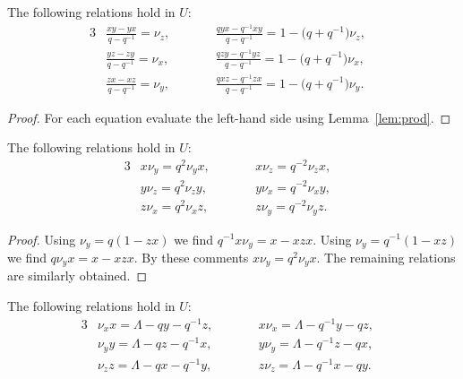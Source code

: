\begin{Lemma}
The following relations hold in
$U$:
\begin{alignat}{3}
& \frac{xy-yx}{q-q^{-1}}=
\nu_z, \qquad &&
\frac{qyx-q^{-1}xy}{q-q^{-1}}= 1-\big(q+q^{-1}\big)\nu_z,&
\label{eq:double1}
\\
& \frac{yz-zy}{q-q^{-1}}=
\nu_x,\qquad&&
\frac{qzy-q^{-1}yz}{q-q^{-1}}= 1-\big(q+q^{-1}\big)\nu_x,&
\label{eq:double2}
\\
& \frac{zx-xz}{q-q^{-1}}=
\nu_y,\qquad &&
\frac{qxz-q^{-1}zx}{q-q^{-1}}= 1-\big(q+q^{-1}\big)\nu_y. &
\label{eq:double3}
\end{alignat}
\end{Lemma}

\begin{proof}
For each equation
evaluate the left-hand side using
Lemma~\ref{lem:prod}.
\end{proof}


\begin{Lemma}
\label{lem:qcom}
The following relations hold in
$U$:
\begin{alignat}{3}
& x \nu_y = q^2 \nu_y x, \qquad &&
x \nu_z = q^{-2} \nu_z x, &
\label{eq:com1}
\\
& y \nu_z = q^2 \nu_z y, \qquad &&
y \nu_x = q^{-2} \nu_x y, &
\label{eq:com2}
\\
& z \nu_x = q^2 \nu_x z, \qquad &&
z \nu_y = q^{-2} \nu_y z. &
\label{eq:com3}
\end{alignat}
\end{Lemma}

\begin{proof}
Using $\nu_y = q(1-zx)$ we f\/ind
$q^{-1}x \nu_y=x-xzx$.
Using $\nu_y= q^{-1}(1-xz)$ we f\/ind
$q\nu_y x = x - xzx$. By these comments
$x \nu_y = q^2 \nu_y x$. The remaining
relations are similarly obtained.
\end{proof}

\begin{Lemma}
\label{lem:xvx}
The following relations hold in
$U$:
\begin{alignat}{3}
& \nu_x x = \Lambda - q y - q^{-1}z,
\qquad &&
x\nu_x = \Lambda - q^{-1}y - qz, &
\label{eq:nuxX}
\\
& \nu_y y = \Lambda - q z - q^{-1}x,
\qquad &&
y\nu_y = \Lambda - q^{-1}z - qx,&
\label{eq:nuyY}
\\
& \nu_z z = \Lambda - q x - q^{-1}y,
\qquad &&
z\nu_z = \Lambda - q^{-1}x - qy.&
\label{eq:nuzZ}
\end{alignat}
\end{Lemma}

